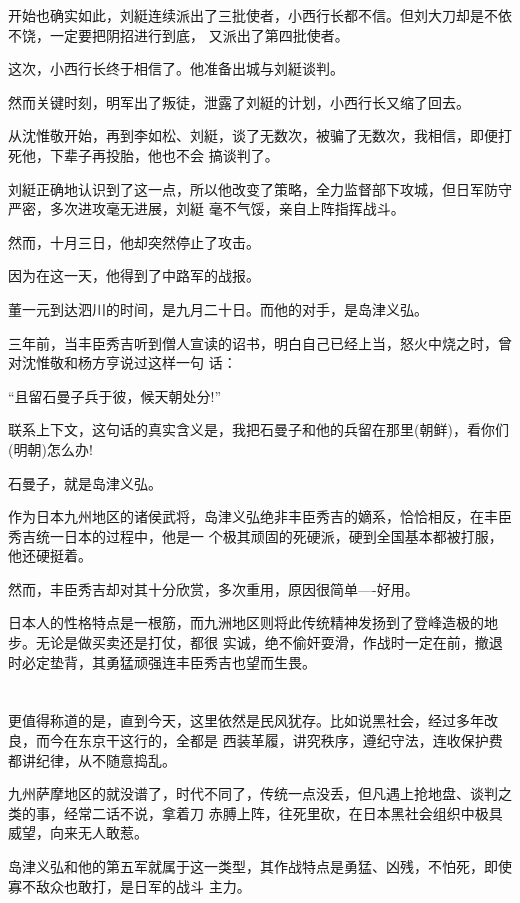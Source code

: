 \documentclass[11pt,a4paper,onecolumn]{article}
\begin{document}
开始也确实如此，刘綎连续派出了三批使者，小西行长都不信。但刘大刀却是不依不饶，一定要把阴招进行到底，
又派出了第四批使者。

这次，小西行长终于相信了。他准备出城与刘綎谈判。

然而关键时刻，明军出了叛徒，泄露了刘綎的计划，小西行长又缩了回去。

从沈惟敬开始，再到李如松、刘綎，谈了无数次，被骗了无数次，我相信，即便打死他，下辈子再投胎，他也不会
搞谈判了。

刘綎正确地认识到了这一点，所以他改变了策略，全力监督部下攻城，但日军防守严密，多次进攻毫无进展，刘綎
毫不气馁，亲自上阵指挥战斗。

然而，十月三日，他却突然停止了攻击。

因为在这一天，他得到了中路军的战报。

董一元到达泗川的时间，是九月二十日。而他的对手，是岛津义弘。

三年前，当丰臣秀吉听到僧人宣读的诏书，明白自己已经上当，怒火中烧之时，曾对沈惟敬和杨方亨说过这样一句
话：

``且留石曼子兵于彼，候天朝处分!''

联系上下文，这句话的真实含义是，我把石曼子和他的兵留在那里(朝鲜)，看你们(明朝)怎么办!

石曼子，就是岛津义弘。

作为日本九州地区的诸侯武将，岛津义弘绝非丰臣秀吉的嫡系，恰恰相反，在丰臣秀吉统一日本的过程中，他是一
个极其顽固的死硬派，硬到全国基本都被打服，他还硬挺着。

然而，丰臣秀吉却对其十分欣赏，多次重用，原因很简单----好用。

日本人的性格特点是一根筋，而九洲地区则将此传统精神发扬到了登峰造极的地步。无论是做买卖还是打仗，都很
实诚，绝不偷奸耍滑，作战时一定在前，撤退时必定垫背，其勇猛顽强连丰臣秀吉也望而生畏。

\section[\thesection]{}

更值得称道的是，直到今天，这里依然是民风犹存。比如说黑社会，经过多年改良，而今在东京干这行的，全都是
西装革履，讲究秩序，遵纪守法，连收保护费都讲纪律，从不随意捣乱。

九州萨摩地区的就没谱了，时代不同了，传统一点没丢，但凡遇上抢地盘、谈判之类的事，经常二话不说，拿着刀
赤膊上阵，往死里砍，在日本黑社会组织中极具威望，向来无人敢惹。

岛津义弘和他的第五军就属于这一类型，其作战特点是勇猛、凶残，不怕死，即使寡不敌众也敢打，是日军的战斗
主力。
\end{document}
